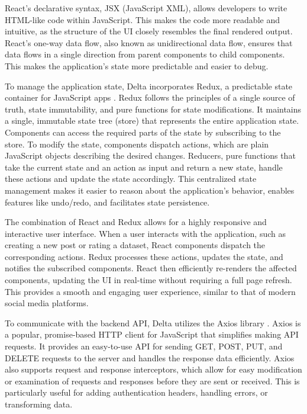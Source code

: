 \documentclass[conference]{IEEEtran}
\begin{document}
React's declarative syntax, JSX (JavaScript XML), allows developers to write HTML-like code within JavaScript. This makes the code more readable and intuitive, as the structure of the UI closely resembles the final rendered output. React's one-way data flow, also known as unidirectional data flow, ensures that data flows in a single direction from parent components to child components. This makes the application's state more predictable and easier to debug.

To manage the application state, Delta incorporates Redux, a predictable state container for JavaScript apps \cite{redux}. Redux follows the principles of a single source of truth, state immutability, and pure functions for state modifications. It maintains a single, immutable state tree (store) that represents the entire application state. Components can access the required parts of the state by subscribing to the store. To modify the state, components dispatch actions, which are plain JavaScript objects describing the desired changes. Reducers, pure functions that take the current state and an action as input and return a new state, handle these actions and update the state accordingly. This centralized state management makes it easier to reason about the application's behavior, enables features like undo/redo, and facilitates state persistence.

The combination of React and Redux allows for a highly responsive and interactive user interface. When a user interacts with the application, such as creating a new post or rating a dataset, React components dispatch the corresponding actions. Redux processes these actions, updates the state, and notifies the subscribed components. React then efficiently re-renders the affected components, updating the UI in real-time without requiring a full page refresh. This provides a smooth and engaging user experience, similar to that of modern social media platforms.

To communicate with the backend API, Delta utilizes the Axios library \cite{axios}. Axios is a popular, promise-based HTTP client for JavaScript that simplifies making API requests. It provides an easy-to-use API for sending GET, POST, PUT, and DELETE requests to the server and handles the response data efficiently. Axios also supports request and response interceptors, which allow for easy modification or examination of requests and responses before they are sent or received. This is particularly useful for adding authentication headers, handling errors, or transforming data.
\end{document}

